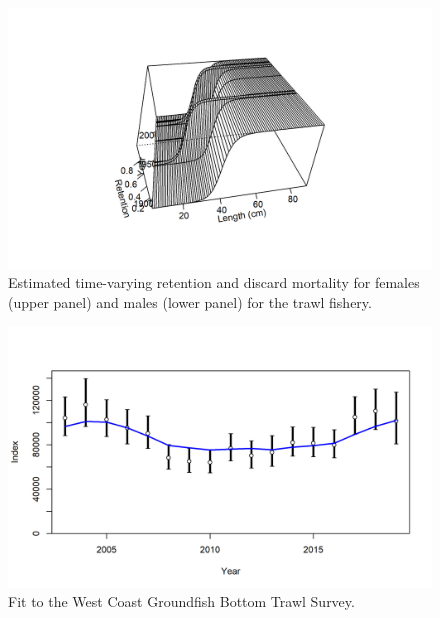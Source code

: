 \documentclass[11pt,
  english,
  a4paper,
]{article}
\begin{document}
\begin{figure}
\centering
\includegraphics[width=1\textwidth,height=1\textheight]{figs/sel05_timevary_ret_surf_flt3sex2.png}
\caption{Estimated time-varying retention and discard mortality for females (upper panel) and males (lower panel) for the trawl fishery.\label{fig:twltimevaryslx}}
\end{figure}

\tagmcend\tagstructend


\begin{figure}
\centering
\includegraphics[width=1\textwidth,height=1\textheight]{figs/index2_cpuefit_NWCBO.png}
\caption{Fit to the West Coast Groundfish Bottom Trawl Survey.\label{fig:ind_NWFSC}}
\end{figure}

\tagmcend\tagstructend

\end{document}
